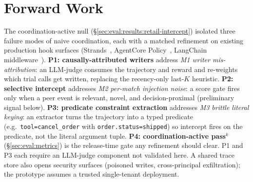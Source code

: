 \section{Forward Work}
\label{sec:proposals}
\label{sec:discussion}

The coordination-active null
(\S\ref{sec:eval:results:retail-intercept}) isolated three failure
modes of naive coordination, each with a matched refinement on
existing production hook surfaces (Strands~\cite{strandshooks2025},
AgentCore Policy~\cite{agentcorepolicy2025}, LangChain
middleware~\cite{langchainmiddleware2026}).
\textbf{P1: causally-attributed writers} address \emph{M1
writer mis-attribution}: an LLM-judge consumes the trajectory
and reward and re-weights which trial calls get written, replacing
the recency-only last-$K$ heuristic.
\textbf{P2: selective intercept} addresses \emph{M2 per-match
injection noise}: a score gate fires only when a peer event is
relevant, novel, and decision-proximal (preliminary signal below).
\textbf{P3: predicate constraint extraction} addresses \emph{M3
brittle literal keying}: an extractor turns the trajectory into a
typed predicate (e.g.\ \texttt{tool=cancel\_order} with
\texttt{order.status=shipped}) so intercept fires on the
predicate, not the literal argument tuple.
\textbf{P4: coordination-active pass$^k$}
(\S\ref{sec:eval:metrics}) is the release-time gate any refinement
should clear. P1 and P3 each require an LLM-judge component not
validated here. A shared trace store also opens security surfaces
(poisoned writes, cross-principal exfiltration); the prototype
assumes a trusted single-tenant deployment.

